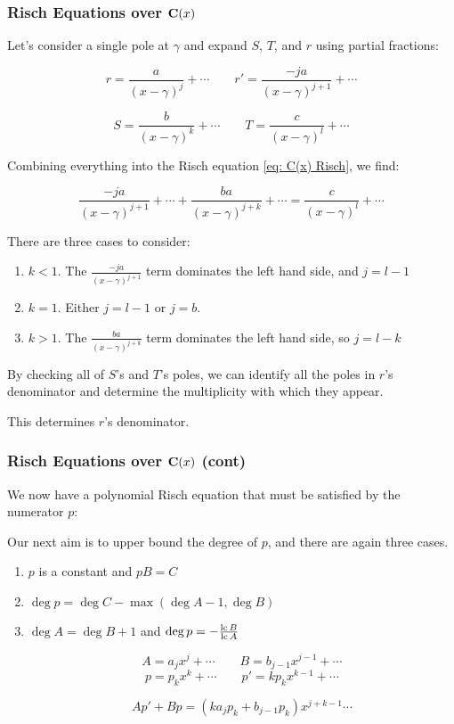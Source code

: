 \documentclass[aspectratio=169,dvipsnames]{beamer}
\newcommand{\lc}{{\rm lc\,}}
\begin{document}
\begin{frame}[fragile]
\small
\frametitle{Risch Equations over $\mathbf{C}(x)$}

Let's consider a single pole at
$\gamma$ and expand $S$, $T$, and $r$ using partial fractions:

$$r = \frac{a}{(x-\gamma)^j} + \cdots  \qquad  r' = \frac{-ja}{(x-\gamma)^{j+1}} + \cdots$$

$$S = \frac{b}{(x-\gamma)^k} + \cdots \qquad T = \frac{c}{(x-\gamma)^l} + \cdots$$

Combining everything into the Risch equation \eqref{eq: C(x) Risch}, we find:

$$\frac{-ja}{(x-\gamma)^{j+1}} + \cdots + \frac{ba}{(x-\gamma)^{j+k}} + \cdots = \frac{c}{(x-\gamma)^l} + \cdots$$

There are three cases to consider:

\begin{enumerate}

\item $k<1$.  The $\frac{-ja}{(x-\gamma)^{j+1}}$ term dominates the left hand side,
and $j = l-1$

\item $k=1$.  Either $j=l-1$ or $j=b$.

\item $k>1$.  The $\frac{ba}{(x-\gamma)^{j+k}}$ term dominates the left hand side, so $j=l-k$

\end{enumerate}

By checking all of $S$'s and $T$'s poles, we can
identify all the poles in $r$'s denominator and determine the
multiplicity with which they appear.

\bigskip

This determines $r$'s denominator.

\end{frame}

\begin{frame}[fragile]
\small
\frametitle{Risch Equations over $\mathbf{C}(x)$ (cont)}

We now have a polynomial Risch equation
that must be satisfied by the numerator $p$:


Our next aim is to upper bound the degree of $p$, and there are again three cases.

\begin{enumerate}
\item $p$ is a constant and $pB = C$
\item $\deg p = \deg C - \max(\deg A - 1, \deg B)$
\item $\deg A = \deg B + 1$ and $\deg p =-\frac{\lc B}{\lc A} $

$$A = a_j x^j + \cdots \qquad B = b_{j-1} x^{j-1} + \cdots$$
$$p = p_k x^k + \cdots \qquad p' = k p_k x^{k-1} + \cdots$$

$$A p' + B p = (k a_j p_k + b_{j-1} p_k) x^{j+k-1} \cdots$$

\end{enumerate}

\end{frame}
\end{document}
